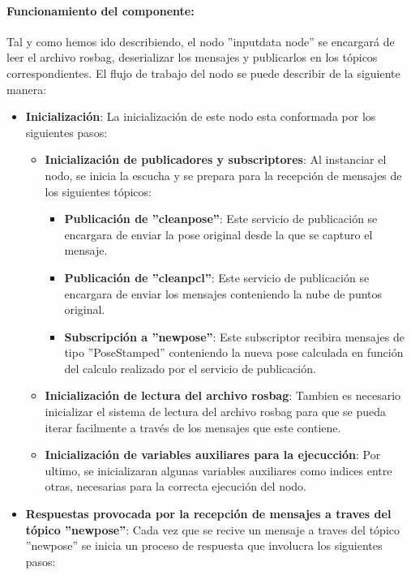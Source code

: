 \documentclass[12pt, a4paper, twoside]{article}
\begin{document}
\paragraph{Funcionamiento del componente:}
Tal y como hemos ido describiendo, el nodo ''input\textunderscore data \textunderscore node'' se encargará de leer el archivo rosbag, deserializar los mensajes y
publicarlos en los tópicos correspondientes. El flujo de trabajo del nodo se puede describir de la siguiente manera:
\begin{itemize}
  \item \textbf{Inicialización}: La inicialización de este nodo esta conformada por los siguientes pasos:
  \begin{itemize}
    \item \textbf{Inicialización de publicadores y subscriptores}: Al instanciar el nodo, se inicia la escucha y se prepara para la recepción de mensajes de los 
    siguientes tópicos:
    \begin{itemize}
      \item \textbf{Publicación de ''clean\textunderscore pose''}: Este servicio de publicación se encargara de enviar la pose original desde la que se capturo el mensaje.
      \item \textbf{Publicación de ''clean\textunderscore pcl''}: Este servicio de publicación se encargara de enviar los mensajes conteniendo la nube de puntos original.
      \item \textbf{Subscripción a ''new\textunderscore pose''}: Este subscriptor recibira mensajes de tipo ''PoseStamped'' conteniendo la nueva pose calculada en función 
      del calculo realizado por el servicio de publicación.
    \end{itemize}
    \item \textbf{Inicialización de lectura del archivo rosbag}: Tambien es necesario inicializar el sistema de lectura del archivo rosbag para que se pueda iterar facilmente
    a través de los mensajes que este contiene.
    \item \textbf{Inicialización de variables auxiliares para la ejecucción}: Por ultimo, se inicializaran algunas variables auxiliares como indices entre otras, necesarias 
    para la correcta ejecución del nodo.
  \end{itemize}
  \item \textbf{Respuestas provocada por la recepción de mensajes a traves del tópico ''new\textunderscore pose''}: Cada vez que se recive un mensaje a traves del tópico 
  ''new\textunderscore pose'' se inicia un proceso de respuesta que involucra los siguientes pasos:

\end{itemize}
\end{document}
